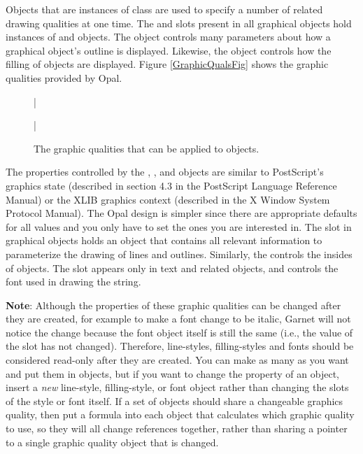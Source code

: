 

Objects that are instances of class  are used to
specify a number of related drawing qualities at one time.  The
 and  slots present in all graphical
objects hold instances of  and 
objects.  The  object controls many parameters about how
a graphical object's outline is displayed.  Likewise, the
 object controls how the filling of
objects are displayed.  Figure \ref{GraphicQualsFig} shows the graphic
qualities provided by Opal.

\begin{figure}
\bar{}
\begin{center}
\end{center}
\caption{The graphic qualities that can be applied to objects.}
\bar{}
\end{figure}

The properties controlled by the ,
, and  objects are similar to
PostScript's graphics state (described in section 4.3 in the
PostScript Language Reference Manual) or the XLIB graphics context
(described in the X Window System
Protocol Manual).  The Opal design is simpler since there are
appropriate defaults for all values and you only have to set the ones you
are interested in.
The  slot in graphical objects holds an object that
contains all relevant information to parameterize the drawing of lines and
outlines.  Similarly, the  controls the insides of
objects.  The  slot appears only in text and related objects, and
controls the font used in drawing the string.

{\bf Note}: Although the properties of these graphic qualities can be changed
after they are created, for example to make a font change to be italic,
Garnet will not notice the change because the font object itself is
still the same (i.e., the value of the  slot has not changed).
Therefore, line-styles, filling-styles and fonts should be considered
read-only after they are created.  You can make as many as you
want and put them in objects, but if you want to change the property of an
object, insert a {\it new} line-style, filling-style, or font object rather
than changing the slots of the style or font itself.  If a set of objects
should share a changeable graphics quality, then put a formula into each
object that calculates which graphic quality to use, so they will all change
references together, rather than sharing a pointer to a single graphic
quality object that is changed.



